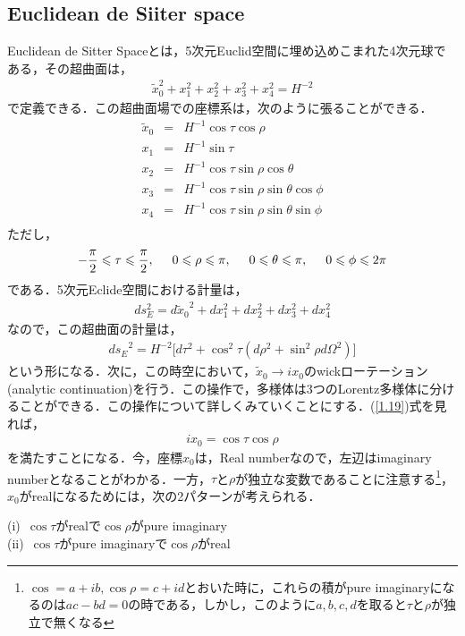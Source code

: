 \subsection{Euclidean de Siiter space}
Euclidean de Sitter Spaceとは，5次元Euclid空間に埋め込めこまれた4次元球である，その超曲面は，
\begin{eqnarray}
  \tilde{x}_0^2+x_1^2+x_2^2+x_3^2+x_4^2=H^{-2}
\end{eqnarray}
で定義できる．この超曲面場での座標系は，次のように張ることができる．
\begin{eqnarray}
  \label{1.19}
  \tilde{x}_0&=&H^{-1}\cos{\tau}\cos{\rho} \\
  \label{test}
  x_1&=&H^{-1}\sin{\tau} \\
  x_2&=&H^{-1}\cos{\tau}\sin{\rho}\cos{\theta} \\
  x_3&=&H^{-1}\cos{\tau}\sin{\rho}\sin{\theta}\cos{\phi} \\
  x_4&=&H^{-1}\cos{\tau}\sin{\rho}\sin{\theta}\sin{\phi} \\
\end{eqnarray}
ただし，
\begin{eqnarray}
  \label{1.25}
  -\frac{\pi}{2} \leqslant \tau \leqslant \frac{\pi}{2},\hspace{0.5cm} 0 \leqslant \rho \leqslant \pi,\hspace{0.5cm} 0 \leqslant \theta \leqslant \pi, \hspace{0.5cm} 0 \leqslant \phi \leqslant 2\pi
\end{eqnarray}
である．5次元Eclide空間における計量は，
\begin{eqnarray}
  ds_{E}^2=d{\tilde{x}_0}^2+dx_1^2+dx_2^2+dx_3^2+dx_4^2
\end{eqnarray}
 なので，この超曲面の計量は，
 \begin{eqnarray}
   \label{4sphereM}
   {ds_{E}}^2=H^{-2}\biggl[d\tau^2 + \cos^2\tau(d\rho^2+\sin^2\rho d\Omega^2)\biggr]
 \end{eqnarray}
 という形になる．次に，この時空において，$\tilde{x}_0\rightarrow ix_{0}$のwickローテーション(analytic continuation)を行う．この操作で，多様体は3つのLorentz多様体に分けることができる．この操作について詳しくみていくことにする．(\ref{1.19})式を見れば，
 \begin{eqnarray}
   ix_0=\cos\tau\cos\rho
 \end{eqnarray}
を満たすことになる．今，座標$x_0$は，Real numberなので，左辺はimaginary numberとなることがわかる．一方，$\tau$と$\rho$が独立な変数であることに注意する\footnote{$\cos=a+ib,\cos\rho=c+id$とおいた時に，これらの積がpure imaginaryになるのは$ac-bd=0$の時である，しかし，このように$a,b,c,d$を取ると$\tau$と$\rho$が独立で無くなる}，$x_0$がrealになるためには，次の2パターンが考えられる．
\begin{center}
  (i)\ $\cos\tau$がrealで$\cos\rho$がpure imaginary \\
  (ii)\ $\cos\tau$がpure imaginaryで$\cos\rho$がreal
\end{center}

